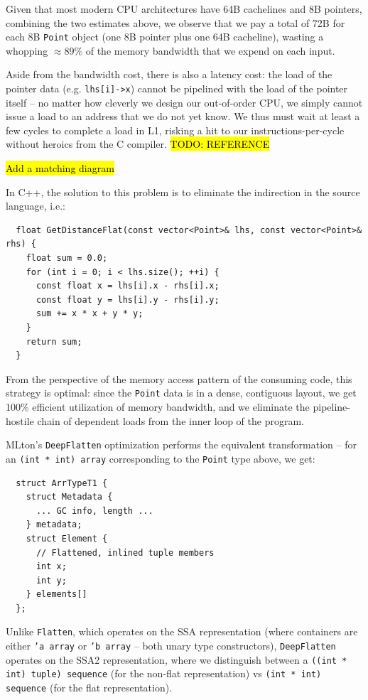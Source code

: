 \documentclass[leqno,11pt]{article}
\begin{document}
Given that most modern CPU architectures have 64B cachelines and 8B pointers,
combining the two estimates above, we observe that we pay a total of 72B for
each 8B \texttt{Point} object (one 8B pointer plus one 64B cacheline), wasting a
whopping $\approx 89\%$ of the memory bandwidth that we expend on each input.

Aside from the bandwidth cost, there is also a latency cost: the load of the
pointer data (e.g. \texttt{lhs[i]->x}) cannot be pipelined with the load of the
pointer itself -- no matter how cleverly we design our out-of-order CPU, we
simply cannot issue a load to an address that we do not yet know. We thus must
wait at least a few cycles to complete a load in L1, risking a hit to our
instructions-per-cycle without heroics from the C compiler. \hl{TODO: REFERENCE}

\hl{Add a matching diagram}

In C++, the solution to this problem is to eliminate the indirection in the
source language, i.e.:
\begin{verbatim}
  float GetDistanceFlat(const vector<Point>& lhs, const vector<Point>& rhs) {
    float sum = 0.0;
    for (int i = 0; i < lhs.size(); ++i) {
      const float x = lhs[i].x - rhs[i].x;
      const float y = lhs[i].y - rhs[i].y;
      sum += x * x + y * y;
    }
    return sum;
  }
\end{verbatim}
From the perspective of the memory access pattern of the consuming code, this
strategy is optimal: since the \texttt{Point} data is in a dense, contiguous
layout, we get 100\% efficient utilization of memory bandwidth, and we eliminate
the pipeline-hostile chain of dependent loads from the inner loop of the
program.

MLton's \texttt{DeepFlatten} optimization performs the equivalent transformation
-- for an \texttt{(int * int) array} corresponding to the \texttt{Point} type
above, we get:
\begin{verbatim}
  struct ArrTypeT1 {
    struct Metadata {
      ... GC info, length ...
    } metadata;
    struct Element {
      // Flattened, inlined tuple members
      int x;
      int y;
    } elements[]
  };
\end{verbatim}
Unlike \texttt{Flatten}, which operates on the SSA representation (where
containers are either \texttt{'a array} or \texttt{'b array} -- both unary type
constructors), \texttt{DeepFlatten} operates on the SSA2 representation, where
we distinguish between a \texttt{((int * int) tuple) sequence} (for the non-flat
representation) vs \texttt{(int * int) sequence} (for the flat representation).
\end{document}
